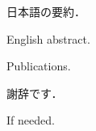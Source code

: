 \documentclass[master]{cimt}
\begin{document}
\maketitle

\frontmatter

\begin{jabstract}
  日本語の要約．
\end{jabstract}

\begin{eabstract}
  English abstract.
\end{eabstract}

\tableofcontents

\mainmatter








\backmatter

\pubUseLongName %
\begin{publications}
  \item Publications.
\end{publications}




\begin{acknowledgements}
  謝辞です．
\end{acknowledgements}

\appendix

If needed.
\end{document}
